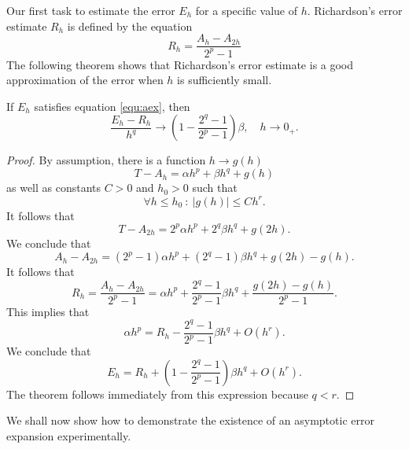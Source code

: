 \documentclass[runningheads]{llncs}
\begin{document}
Our first task to estimate the error $E_h$ for a specific value of $h$. Richardson's error estimate $R_h$ is defined by the equation
\begin{equation}
 R_h =  \frac{A_h - A_{2h}}{2^p - 1}
\end{equation}
The following theorem shows that Richardson's error estimate is a good approximation of the error when $h$ is sufficiently small.

\begin{theorem} If $E_h$ satisfies equation \eqref{equ:aex}, then
  \begin{equation}
    \frac{E_h - R_h}{h^q} \rightarrow  \left(1 - \frac{2^q-1}{2^p-1} \right) \beta, \quad h \rightarrow 0_+.
  \end{equation}
\end{theorem}
\begin{proof}
  By assumption, there is a function $h \rightarrow g(h)$ 
  \begin{equation}
    T - A_h  = \alpha h^p + \beta h^q + g(h)
  \end{equation}
  as well as constants $C>0$ and $h_0 > 0$ such that
  \begin{equation}
    \forall h \leq h_0 \: : \: |g(h)| \leq Ch^r.
  \end{equation}
  It follows that
  \begin{equation}
    T- A_{2h} = 2^p \alpha h^p + 2^q \beta h^q + g(2h).
  \end{equation}
  We conclude that
  \begin{equation} \label{equ:Dh:1}
    A_h - A_{2h} = (2^p - 1) \alpha h^p + (2^q - 1) \beta h^q + g(2h) - g(h).
  \end{equation}
  It follows that
  \begin{equation}
    R_h = \frac{A_h - A_{2h}}{2^p - 1} = \alpha h^p + \frac{2^q-1}{2^p-1} \beta h^q + \frac{g(2h)-g(h)}{2^p-1}.
  \end{equation}
  This implies that
  \begin{equation}
    \alpha h^p =  R_h - \frac{2^q-1}{2^p-1} \beta h^q + O(h^r).
  \end{equation}
  We conclude that
  \begin{equation}
    E_h = R_h + \left(1 - \frac{2^q-1}{2^p-1} \right) \beta h^q + O(h^r).
  \end{equation}
  The theorem follows immediately from this expression because $q < r$.
\end{proof}
We shall now show how to demonstrate the existence of an asymptotic error expansion experimentally.
\end{document}
